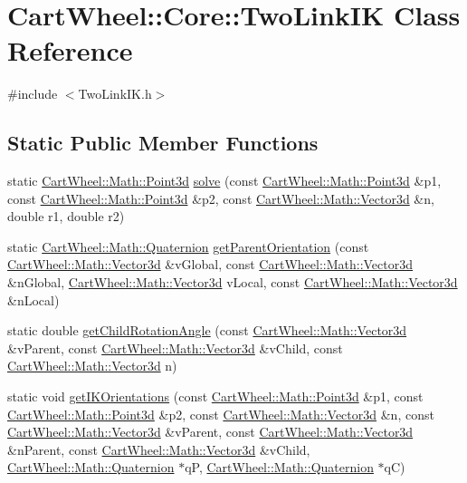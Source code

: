 \hypertarget{classCartWheel_1_1Core_1_1TwoLinkIK}{
\section{CartWheel::Core::TwoLinkIK Class Reference}
\label{classCartWheel_1_1Core_1_1TwoLinkIK}
}


{\ttfamily \#include $<$TwoLinkIK.h$>$}

\subsection*{Static Public Member Functions}
\begin{DoxyCompactItemize}
\item 
static \hyperlink{classCartWheel_1_1Math_1_1Point3d}{CartWheel::Math::Point3d} \hyperlink{classCartWheel_1_1Core_1_1TwoLinkIK_a27c5a87ae2b76b3bcdc822e35059acce}{solve} (const \hyperlink{classCartWheel_1_1Math_1_1Point3d}{CartWheel::Math::Point3d} \&p1, const \hyperlink{classCartWheel_1_1Math_1_1Point3d}{CartWheel::Math::Point3d} \&p2, const \hyperlink{classCartWheel_1_1Math_1_1Vector3d}{CartWheel::Math::Vector3d} \&n, double r1, double r2)
\item 
static \hyperlink{classCartWheel_1_1Math_1_1Quaternion}{CartWheel::Math::Quaternion} \hyperlink{classCartWheel_1_1Core_1_1TwoLinkIK_a79e039bab10cb8a0a80c673034b8d30f}{getParentOrientation} (const \hyperlink{classCartWheel_1_1Math_1_1Vector3d}{CartWheel::Math::Vector3d} \&vGlobal, const \hyperlink{classCartWheel_1_1Math_1_1Vector3d}{CartWheel::Math::Vector3d} \&nGlobal, \hyperlink{classCartWheel_1_1Math_1_1Vector3d}{CartWheel::Math::Vector3d} vLocal, const \hyperlink{classCartWheel_1_1Math_1_1Vector3d}{CartWheel::Math::Vector3d} \&nLocal)
\item 
static double \hyperlink{classCartWheel_1_1Core_1_1TwoLinkIK_a7286e17fe5def23330d98c013630a5bc}{getChildRotationAngle} (const \hyperlink{classCartWheel_1_1Math_1_1Vector3d}{CartWheel::Math::Vector3d} \&vParent, const \hyperlink{classCartWheel_1_1Math_1_1Vector3d}{CartWheel::Math::Vector3d} \&vChild, const \hyperlink{classCartWheel_1_1Math_1_1Vector3d}{CartWheel::Math::Vector3d} n)
\item 
static void \hyperlink{classCartWheel_1_1Core_1_1TwoLinkIK_a18d95e0099d3419cd6a1d7c34dd291a7}{getIKOrientations} (const \hyperlink{classCartWheel_1_1Math_1_1Point3d}{CartWheel::Math::Point3d} \&p1, const \hyperlink{classCartWheel_1_1Math_1_1Point3d}{CartWheel::Math::Point3d} \&p2, const \hyperlink{classCartWheel_1_1Math_1_1Vector3d}{CartWheel::Math::Vector3d} \&n, const \hyperlink{classCartWheel_1_1Math_1_1Vector3d}{CartWheel::Math::Vector3d} \&vParent, const \hyperlink{classCartWheel_1_1Math_1_1Vector3d}{CartWheel::Math::Vector3d} \&nParent, const \hyperlink{classCartWheel_1_1Math_1_1Vector3d}{CartWheel::Math::Vector3d} \&vChild, \hyperlink{classCartWheel_1_1Math_1_1Quaternion}{CartWheel::Math::Quaternion} $\ast$qP, \hyperlink{classCartWheel_1_1Math_1_1Quaternion}{CartWheel::Math::Quaternion} $\ast$qC)
\end{DoxyCompactItemize}


